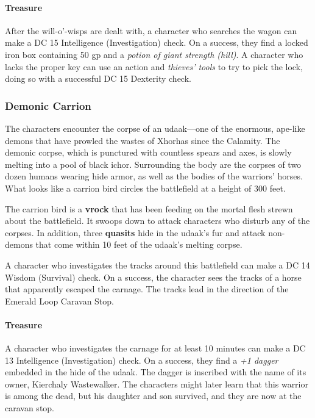\documentclass[a4paper, 11pt, bg=full, twocolumn, nooutline]{dndbook}
\begin{document}
\paragraph{Treasure}

After the will-o'-wisps are dealt with, a character who searches the wagon can make a DC 15 Intelligence (Investigation) check. On a success, they find a locked iron box containing 50 gp and a \textit{potion of giant strength (hill)}. A character who lacks the proper key can use an action and \textit{thieves' tools} to try to pick the lock, doing so with a successful DC 15 Dexterity check.


\subsubsection{Demonic Carrion}

The characters encounter the corpse of an udaak---one of the enormous, ape-like demons that have prowled the wastes of Xhorhas since the Calamity. The demonic corpse, which is punctured with countless spears and axes, is slowly melting into a pool of black ichor. Surrounding the body are the corpses of two dozen humans wearing hide armor, as well as the bodies of the warriors' horses. What looks like a carrion bird circles the battlefield at a height of 300 feet.

The carrion bird is a \textbf{vrock} that has been feeding on the mortal flesh strewn about the battlefield. It swoops down to attack characters who disturb any of the corpses. In addition, three \textbf{quasits} hide in the udaak's fur and attack non-demons that come within 10 feet of the udaak's melting corpse.

A character who investigates the tracks around this battlefield can make a DC 14 Wisdom (Survival) check. On a success, the character sees the tracks of a horse that apparently escaped the carnage. The tracks lead in the direction of the Emerald Loop Caravan Stop.

\paragraph{Treasure}

A character who investigates the carnage for at least 10 minutes can make a DC 13 Intelligence (Investigation) check. On a success, they find a \textit{+1 dagger} embedded in the hide of the udaak. The dagger is inscribed with the name of its owner, Kierchaly Wastewalker. The characters might later learn that this warrior is among the dead, but his daughter and son survived, and they are now at the caravan stop.
\end{document}
